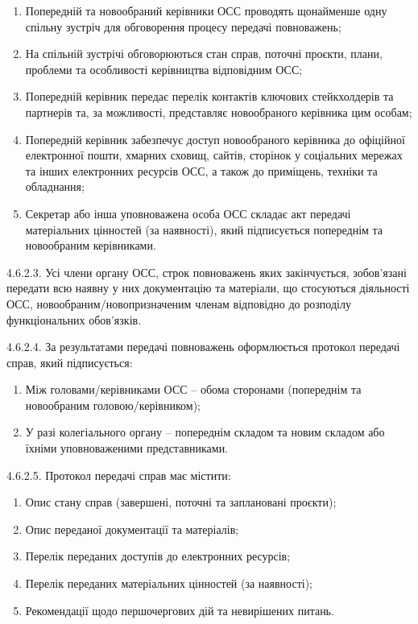             \begin{enumerate}[label=\alph*)]
                \item Попередній та новообраний керівники ОСС проводять щонайменше одну спільну зустріч для обговорення процесу передачі повноважень;
                \item На спільній зустрічі обговорюються стан справ, поточні проєкти, плани, проблеми та особливості керівництва відповідним ОСС;
                \item Попередній керівник передає перелік контактів ключових стейкхолдерів та партнерів та, за можливості, представляє новообраного керівника цим особам;
                \item Попередній керівник забезпечує доступ новообраного керівника до офіційної електронної пошти, хмарних сховищ, сайтів, сторінок у соціальних мережах та інших електронних ресурсів ОСС, а також до приміщень, техніки та обладнання;
                \item Секретар або інша уповноважена особа ОСС складає акт передачі матеріальних цінностей (за наявності), який підписується попереднім та новообраним керівниками.
            \end{enumerate}
            
        4.6.2.3. Усі члени органу ОСС, строк повноважень яких закінчується, зобов'язані передати всю наявну у них документацію та матеріали, що стосуються діяльності ОСС, новообраним/новопризначеним членам відповідно до розподілу функціональних обов'язків.
        
        4.6.2.4. За результатами передачі повноважень оформлюється протокол передачі справ, який підписується:

            \begin{enumerate}[label=\alph*)]
                \item Між головами/керівниками ОСС -- обома сторонами (попереднім та новообраним головою/керівником);
                \item У разі колегіального органу -- попереднім складом та новим складом або їхніми уповноваженими представниками.
            \end{enumerate}
            
        4.6.2.5. Протокол передачі справ має містити:

            \begin{enumerate}[label=\alph*)]
                \item Опис стану справ (завершені, поточні та заплановані проєкти);
                \item Опис переданої документації та матеріалів;
                \item Перелік переданих доступів до електронних ресурсів;
                \item Перелік переданих матеріальних цінностей (за наявності);
                \item Рекомендації щодо першочергових дій та невирішених питань.
            \end{enumerate}

